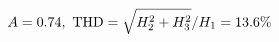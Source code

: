 \documentclass[preview]{standalone}
\begin{document}
\begin{align*}
\special{dvisvgm:raw <g id='unique000'>}A=0.74,\ \text{THD}=\sqrt{H_2^2+H_3^2}/H_1=13.6\%\special{dvisvgm:raw </g>}
\end{align*}
\end{document}
